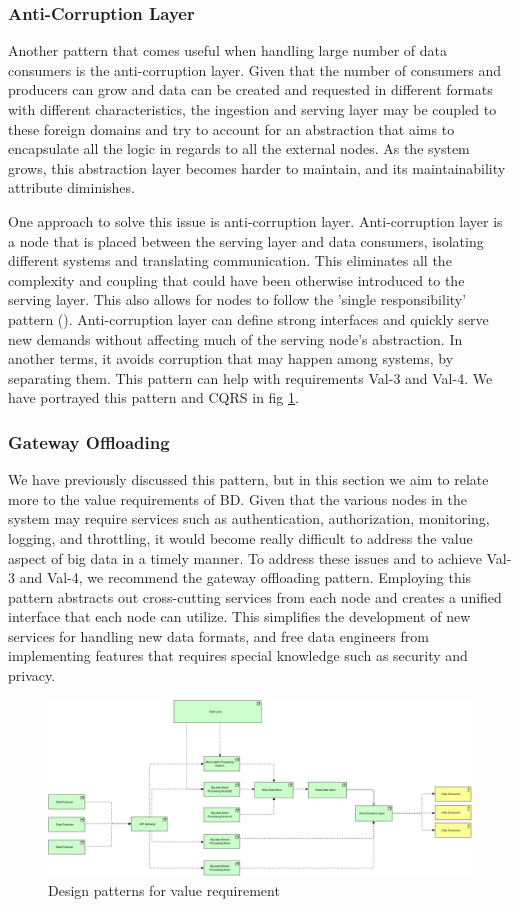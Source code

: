 \documentclass[conference]{IEEEtran}
\begin{document}
\subsubsection{Anti-Corruption Layer}

Another pattern that comes useful when handling large number of data consumers is the anti-corruption layer. Given that the number of consumers and producers can grow and data can be created and requested in different formats with different characteristics, the ingestion and serving layer may be coupled to these foreign domains and try to account for an abstraction that aims to encapsulate all the logic in regards to all the external nodes. As the system grows, this abstraction layer becomes harder to maintain, and its maintainability attribute diminishes. 

One approach to solve this issue is anti-corruption layer. Anti-corruption layer is a node that is placed between the serving layer and data consumers, isolating different systems and translating communication. This eliminates all the complexity and coupling that could have been otherwise introduced to the serving layer. This also allows for nodes to follow the 'single responsibility' pattern (\cite{gamma1995design}). Anti-corruption layer can define strong interfaces and quickly serve new demands without affecting much of the serving node's abstraction. In another terms, it avoids corruption that may happen among systems, by separating them. This pattern can help with requirements Val-3 and Val-4. We have portrayed this pattern and CQRS in fig \ref{fig:Value Requirements}.

\subsubsection{Gateway Offloading}

We have previously discussed this pattern, but in this section we aim to relate more to the value requirements of BD. Given that the various nodes in the system may require services such as authentication, authorization, monitoring, logging, and throttling, it would become really difficult to address the value aspect of big data in a timely manner. To address these issues and to achieve Val-3 and Val-4, we recommend the gateway offloading pattern. Employing this pattern abstracts out cross-cutting services from each node and creates a unified interface that each node can utilize. This simplifies the development of new services for handling new data formats, and free data engineers from implementing features that requires special knowledge such as security and privacy. 


\begin{figure}[!h]
    \includegraphics[]{../Media/Value Requirement.jpg}
    \caption[]{Design patterns for value requirement }
    \label{fig:Value Requirements}
\end{figure}



\end{document}
